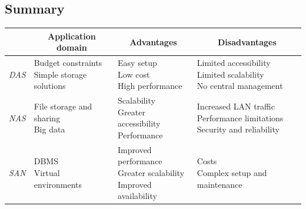 \subsection{Summary}
\begin{table}[H]
    \centering
    \begin{tabular}{|c|lll|}
    \hline
                       & \multicolumn{1}{c}{\textbf{Application domain}}                                                        & \multicolumn{1}{c}{\textbf{Advantages}}                                                                                                                  & \multicolumn{1}{c|}{\textbf{Disadvantages}}    \\ \hline
    \textit{DAS}       & \makecell{Budget constraints \\ Simple storage solutions} & \makecell{Easy setup \\ Low cost \\ High performance}                           & \makecell{Limited accessibility \\ Limited scalability \\ No central management} \\\hline
    \textit{NAS}       & \makecell{File storage and sharing \\ Big data}           & \makecell{Scalability \\ Greater accessibility \\ Performance}                  & \makecell{Increased LAN traffic \\ Performance limitations \\ Security and reliability}     \\ \hline
    \textit{SAN}       & \makecell{DBMS \\ Virtual environments}                   & \makecell{Improved performance \\ Greater scalability \\ Improved availability} & \makecell{Costs \\ Complex setup and maintenance}           \\ \hline                                                            
    \end{tabular}
\end{table}
